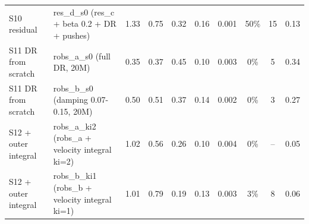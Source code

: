 \begin{table}[t]
{\begin{tabular}{llcccccccc}
S10 residual & res\_d\_s0 (res\_c + beta 0.2 + DR + pushes) & 1.33 & 0.75 & 0.32 & 0.16 & 0.001 & 50\% &15 & 0.13\\
S11 DR from scratch & robs\_a\_s0 (full DR, 20M) & 0.35 & 0.37 & 0.45 & 0.10 & 0.003 & 0\% &5 & 0.34\\
S11 DR from scratch & robs\_b\_s0 (damping 0.07-0.15, 20M) & 0.50 & 0.51 & 0.37 & 0.14 & 0.002 & 0\% &3 & 0.27\\
S12 + outer integral & robs\_a\_ki2 (robs\_a + velocity integral ki=2) & 1.02 & 0.56 & 0.26 & 0.10 & 0.004 & 0\% &-- & 0.05\\
S12 + outer integral & robs\_b\_ki1 (robs\_b + velocity integral ki=1) & 1.01 & 0.79 & 0.19 & 0.13 & 0.003 & 3\% &8 & 0.06\\
\bottomrule\end{tabular}}\end{table}